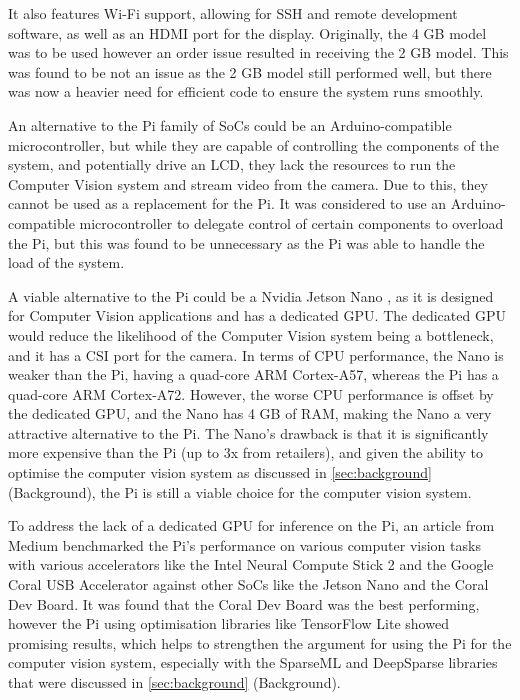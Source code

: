 It also features Wi-Fi support, allowing for SSH and remote development software, as well as an HDMI port for the display. Originally, the 4 GB model was to be used however an order issue resulted in receiving the 2 GB model. This was found to be not an issue as the 2 GB model still performed well, but there was now a heavier need for efficient code to ensure the system runs smoothly.

An alternative to the Pi family of SoCs could be an Arduino-compatible microcontroller, but while they are capable of controlling the components of the system, and potentially drive an LCD, they lack the resources to run the Computer Vision system and stream video from the camera. Due to this, they cannot be used as a replacement for the Pi. It was considered to use an Arduino-compatible microcontroller to delegate control of certain components to overload the Pi, but this was found to be unnecessary as the Pi was able to handle the load of the system.

A viable alternative to the Pi could be a Nvidia Jetson Nano \cite{jetsonnano}, as it is designed for Computer Vision applications and has a dedicated GPU. The dedicated GPU would reduce the likelihood of the Computer Vision system being a bottleneck, and it has a CSI port for the camera. In terms of CPU performance, the Nano is weaker than the Pi, having a quad-core ARM Cortex-A57, whereas the Pi has a quad-core ARM Cortex-A72\cite{pi4}. However, the worse CPU performance is offset by the dedicated GPU, and the Nano has 4 GB of RAM, making the Nano a very attractive alternative to the Pi. The Nano's drawback is that it is significantly more expensive than the Pi (up to 3x from retailers), and
given the ability to optimise the computer vision system as discussed in \autoref{sec:background} (Background), the Pi is still a viable choice for the computer vision system.

To address the lack of a dedicated GPU for inference on the Pi, an article from Medium\cite{benchmarks} benchmarked the Pi's performance on various computer vision tasks with various accelerators like the Intel Neural Compute Stick 2 and the Google Coral USB Accelerator against other SoCs like the Jetson Nano and the Coral Dev Board. It was found that the Coral Dev Board was the best performing, however the Pi using optimisation libraries like TensorFlow Lite showed promising results, which helps to strengthen the argument for using the Pi for the computer vision system, especially with the SparseML and DeepSparse libraries that were discussed in \autoref{sec:background} (Background).

